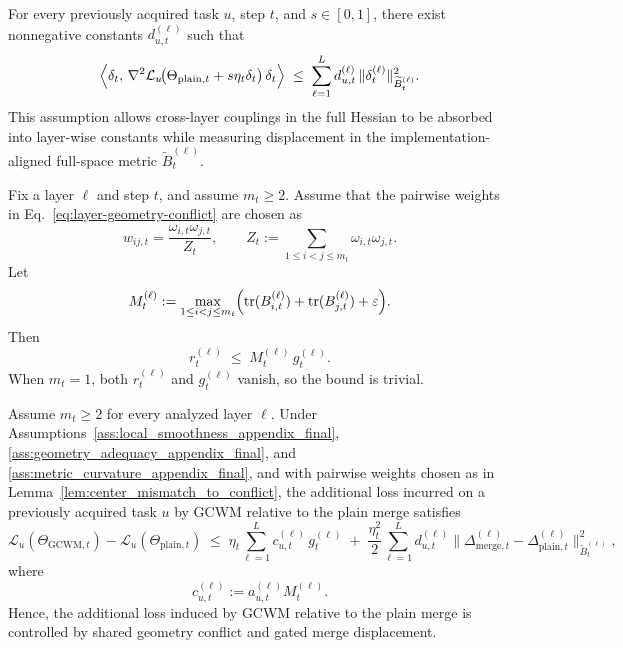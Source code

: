 \documentclass[10pt,a4paper]{amsart}
\begin{document}
\begin{assumption}
\label{ass:metric_curvature_appendix_final}
For every previously acquired task \(u\), step \(t\), and \(s\in[0,1]\), there exist nonnegative constants \(d_{u,t}^{(\ell)}\) such that
\begin{equation}
\Bigl\langle
\delta_t,\,
\nabla^2\mathcal L_u\!\bigl(\Theta_{\mathrm{plain},t}+s\eta_t\delta_t\bigr)\,
\delta_t
\Bigr\rangle
\;\le\;
\sum_{\ell=1}^L
d_{u,t}^{(\ell)}
\,
\|\delta_t^{(\ell)}\|_{\widetilde B_t^{(\ell)}}^2.
\label{eq:metric_curvature_appendix_final}
\end{equation}
This assumption allows cross-layer couplings in the full Hessian to be absorbed into layer-wise constants while measuring displacement in the implementation-aligned full-space metric \(\widetilde B_t^{(\ell)}\).
\end{assumption}

\begin{lemma}
\label{lem:center_mismatch_to_conflict}
Fix a layer \(\ell\) and step \(t\), and assume \(m_t \ge 2\). Assume that the pairwise weights in Eq.~\eqref{eq:layer-geometry-conflict} are chosen as
\[
w_{ij,t}
=
\frac{\omega_{i,t}\omega_{j,t}}{Z_t},
\qquad
Z_t:=\sum_{1\le i<j\le m_t}\omega_{i,t}\omega_{j,t}.
\]
Let
\begin{equation}
M_t^{(\ell)}
:=
\max_{1\le i<j\le m_t}
\Bigl(
\mathrm{tr}(B_{i,t}^{(\ell)})
+
\mathrm{tr}(B_{j,t}^{(\ell)})
+\varepsilon
\Bigr).
\label{eq:trace_scale_constant}
\end{equation}
Then
\begin{equation}
r_t^{(\ell)}
\;\le\;
M_t^{(\ell)}\, g_t^{(\ell)}.
\label{eq:center_mismatch_bound}
\end{equation}
When \(m_t=1\), both \(r_t^{(\ell)}\) and \(g_t^{(\ell)}\) vanish, so the bound is trivial.
\end{lemma}

\begin{theoreml}
\label{thm:conflict_controlled_integration_appendix_final}
Assume \(m_t \ge 2\) for every analyzed layer \(\ell\). Under Assumptions~\ref{ass:local_smoothness_appendix_final}, \ref{ass:geometry_adequacy_appendix_final}, and \ref{ass:metric_curvature_appendix_final}, and with pairwise weights chosen as in Lemma~\ref{lem:center_mismatch_to_conflict}, the additional loss incurred on a previously acquired task \(u\) by GCWM relative to the plain merge satisfies
\begin{equation}
\mathcal L_u(\Theta_{\mathrm{GCWM},t})
-
\mathcal L_u(\Theta_{\mathrm{plain},t})
\;\le\;
\eta_t \sum_{\ell=1}^L c_{u,t}^{(\ell)}\, g_t^{(\ell)}
\;+\;
\frac{\eta_t^2}{2}
\sum_{\ell=1}^L
d_{u,t}^{(\ell)}
\bigl\|
\Delta_{\mathrm{merge},t}^{(\ell)}-\Delta_{\mathrm{plain},t}^{(\ell)}
\bigr\|_{\widetilde B_t^{(\ell)}}^2,
\label{eq:theorem1_final_appendix_revised}
\end{equation}
where
\[
c_{u,t}^{(\ell)} := a_{u,t}^{(\ell)} M_t^{(\ell)}.
\]
Hence, the additional loss induced by GCWM relative to the plain merge is controlled by shared geometry conflict and gated merge displacement.
\end{theoreml}
\end{document}
